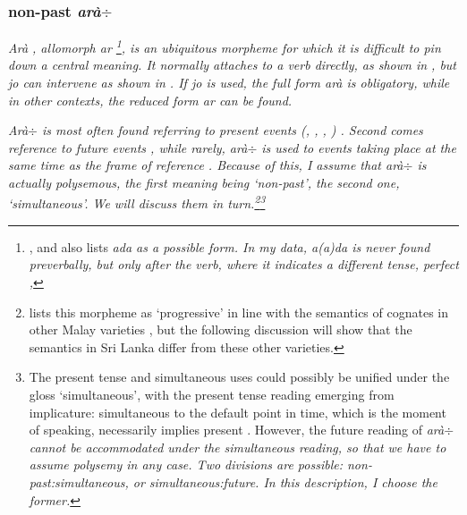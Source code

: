 \subsubsection{non-past \em arà$\div$\em}\label{sec:morph:ara-}
\em Arà \em, allomorph \em ar \em \footnote{\citet[31]{Adelaar1991}, \citep[143]{Slomanson2006cll} and \citet{Slomanson2008lingua} also
 lists \em ada \em  as a possible form. In my data, \em a(a)da \em is never found preverbally, but only after the verb, where it indicates a different tense, perfect , },
is an ubiquitous morpheme for which it is difficult to pin down a central meaning. It normally attaches to a verb directly, as shown in , but \em jo \em can intervene as shown in . If \em jo \em is used, the full form \em arà \em is obligatory, while in other contexts, the reduced form \em ar \em can be found.






\em Arà$\div$ \em is most often found referring to present events (\citet{SmithEtAl2004}, \citet[141]{Slomanson2006cll}, \citet[164]{SmithEtAl2006cll}, \citet{Ansaldo2009book}) . Second comes reference to future events \citep[164]{SmithEtAl2006cll} , while rarely, \em arà$\div$ \em is used to events taking place at the same time as the frame of reference . Because of this, I assume that \em arà$\div$ \em is actually polysemous, the first meaning being `non-past', the second one, `simultaneous'. We will discuss them in turn.\footnote{\citet[31]{Adelaar1991} lists
 this morpheme as `progressive' in line with the semantics of cognates in other Malay varieties \citep{Adelaar2005struct}, but the following discussion will show that the semantics in Sri Lanka differ from these other varieties.}\footnote{The present tense and simultaneous uses could possibly be unified under the gloss `simultaneous', with the present tense reading emerging from implicature: simultaneous to the default point in time, which is  the moment of speaking,  necessarily implies  present \citep[63f]{Comrie1985tense}. However, the future reading of \em arà$\div$ \em cannot be accommodated under the simultaneous reading, so that we have to assume polysemy in any case. Two divisions are possible:  non-past:simultaneous, or simultaneous:future. In this description, I choose the former.}


